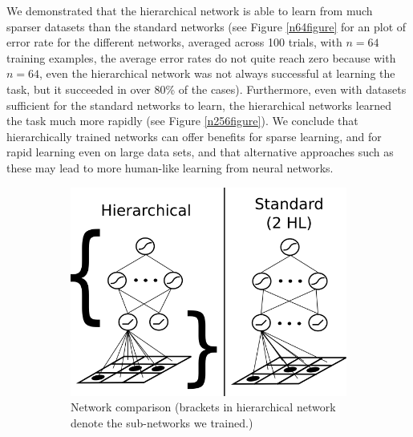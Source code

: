 \documentclass[10pt]{article}
\begin{document}
{We demonstrated that the hierarchical network is able to learn from much sparser datasets than the standard networks (see Figure \ref{n64figure} for an plot of error rate for the different networks, averaged across 100 trials, with $n = 64$ training examples, the average error rates do not quite reach zero because with $n = 64$, even the hierarchical network was not always successful at learning the task, but it succeeded in over 80\% of the cases). Furthermore, even with datasets sufficient for the standard networks to learn, the hierarchical networks learned the task much more rapidly (see Figure \ref{n256figure}). We conclude that hierarchically trained networks can offer benefits for sparse learning, and for rapid learning even on large data sets, and that alternative approaches such as these may lead to more human-like learning from neural networks.
\begin{figure}[H]
    \centering
    \begin{subfigure}[c]{0.35\textwidth}
	\centering
	\includegraphics[width=\textwidth]{figures/hierarchical_NN_abstract_figure.png}
	\caption{Network comparison (brackets in hierarchical network denote the sub-networks we trained.)}
	\label{networkdiagram}
    \end{subfigure}
    \begin{subfigure}[c]{0.3\textwidth}
	\centering

\end{subfigure}
\end{figure}}
\end{document}
